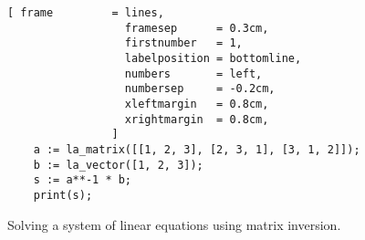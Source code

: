\begin{figure}[!ht]
\centering
\begin{Verbatim}[ frame         = lines, 
                  framesep      = 0.3cm, 
                  firstnumber   = 1,
                  labelposition = bottomline,
                  numbers       = left,
                  numbersep     = -0.2cm,
                  xleftmargin   = 0.8cm,
                  xrightmargin  = 0.8cm,
                ]
    a := la_matrix([[1, 2, 3], [2, 3, 1], [3, 1, 2]]);
    b := la_vector([1, 2, 3]);
    s := a**-1 * b;
    print(s);
\end{Verbatim}
\vspace*{-0.3cm}
\caption{Solving a system of linear equations using matrix inversion.}
\label{fig:solve-linear.stlx}
\end{figure}


